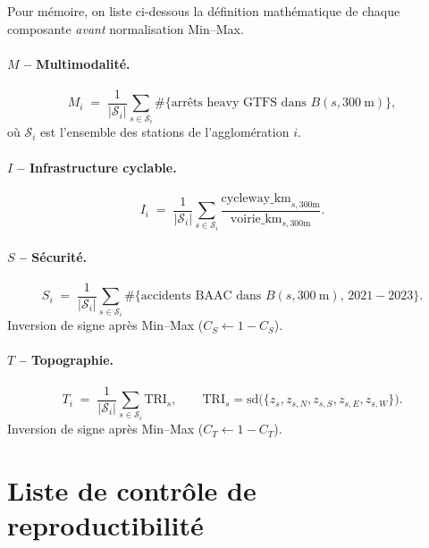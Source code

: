 \documentclass[11pt,a4paper]{article}
\begin{document}
Pour mémoire, on liste ci-dessous la définition mathématique de
chaque composante \emph{avant} normalisation Min--Max.

\paragraph{$M$ -- Multimodalité.}
\begin{equation*}
    M_i \;=\;
    \frac{1}{|\mathcal{S}_i|}
    \sum_{s\in\mathcal{S}_i}
    \#\{\text{arrêts heavy GTFS dans } B(s, \SI{300}{\metre})\},
\end{equation*}
où $\mathcal{S}_i$ est l'ensemble des stations de l'agglomération
$i$.

\paragraph{$I$ -- Infrastructure cyclable.}
\begin{equation*}
    I_i \;=\;
    \frac{1}{|\mathcal{S}_i|}
    \sum_{s\in\mathcal{S}_i}
    \frac{\text{cycleway\_km}_{s,300\text{m}}}
         {\text{voirie\_km}_{s,300\text{m}}}.
\end{equation*}

\paragraph{$S$ -- Sécurité.}
\begin{equation*}
    S_i \;=\;
    \frac{1}{|\mathcal{S}_i|}
    \sum_{s\in\mathcal{S}_i}
    \#\{\text{accidents BAAC dans } B(s, \SI{300}{\metre}), \,
        2021\!-\!2023\}.
\end{equation*}
Inversion de signe après Min--Max
($C_S \leftarrow 1 - C_S$).

\paragraph{$T$ -- Topographie.}
\begin{equation*}
    T_i \;=\;
    \frac{1}{|\mathcal{S}_i|}
    \sum_{s\in\mathcal{S}_i}\mathrm{TRI}_s,
    \qquad
    \mathrm{TRI}_s = \mathrm{sd}\bigl(\{z_s, z_{s,N}, z_{s,S},
                          z_{s,E}, z_{s,W}\}\bigr).
\end{equation*}
Inversion de signe après Min--Max
($C_T \leftarrow 1 - C_T$).

\section{Liste de contrôle de reproductibilité}
\label{app:repro}
\end{document}
